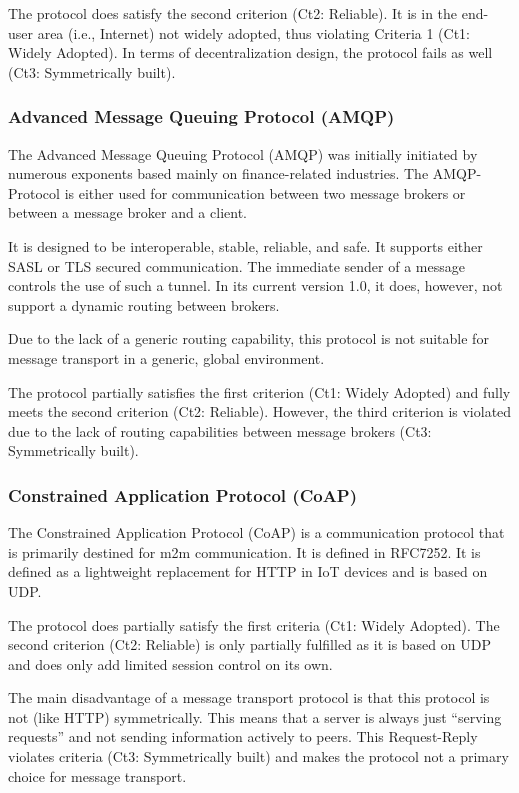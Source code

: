 The protocol does satisfy the second criterion (Ct2: Reliable). It is in the end-user area (i.e., Internet) not widely adopted, thus violating Criteria 1 (Ct1: Widely Adopted). In terms of decentralization design, the protocol fails as well (Ct3: Symmetrically built).

\subsubsection*{Advanced Message Queuing Protocol (AMQP)}
The Advanced Message Queuing Protocol (AMQP) was initially initiated by numerous exponents based mainly on finance-related industries. The AMQP-Protocol is either used for communication between two message brokers or between a message broker and a client\cite{amqp}.

It is designed to be interoperable, stable, reliable, and safe. It supports either SASL or TLS secured communication. The immediate sender of a message controls the use of such a tunnel. In its current version 1.0, it does, however, not support a dynamic routing between brokers\cite{amqp}.

Due to the lack of a generic routing capability, this protocol is not suitable for message transport in a generic, global environment.

The protocol partially satisfies the first criterion (Ct1: Widely Adopted) and fully meets the second criterion (Ct2: Reliable). However, the third criterion is violated due to the lack of routing capabilities between message brokers (Ct3: Symmetrically built).

\subsubsection*{Constrained Application Protocol (CoAP)}
The Constrained Application Protocol (CoAP) is a communication protocol that is primarily destined for m2m communication. It is defined in RFC7252\cite{rfc7252}.  It is defined as a lightweight replacement for HTTP in IoT devices and is based on UDP.

The protocol does partially satisfy the first criteria (Ct1: Widely Adopted). The second criterion (Ct2: Reliable) is only partially fulfilled as it is based on UDP and does only add limited session control on its own.

The main disadvantage of a message transport protocol is that this protocol is not (like HTTP) symmetrically. This means that a server is always just ``serving requests'' and not sending information actively to peers. This Request-Reply violates criteria (Ct3: Symmetrically built) and makes the protocol not a primary choice for message transport. 

